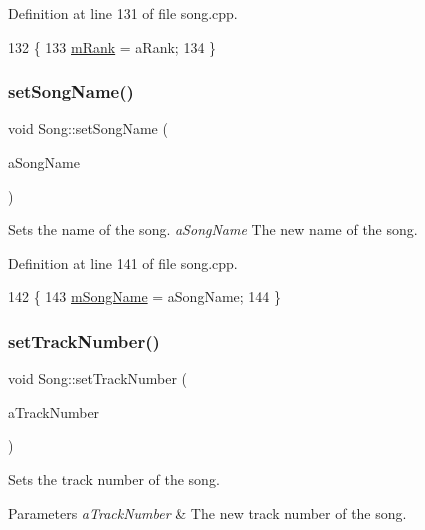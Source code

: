 Definition at line 131 of file song.\+cpp.


\begin{DoxyCode}
132 \{
133     \mbox{\hyperlink{class_song_a18b47d2545fc5e7795cad143092c97e7}{mRank}} = aRank;
134 \}
\end{DoxyCode}
\mbox{\label{class_song_a8ae97c3e5d99c7e8df2e1b7b4f0274ec}} 
\subsubsection{\texorpdfstring{set\+Song\+Name()}{setSongName()}}
{\footnotesize\ttfamily void Song\+::set\+Song\+Name (\begin{DoxyParamCaption}\item[{Q\+String}]{a\+Song\+Name }\end{DoxyParamCaption})}



Sets the name of the song. {\itshape a\+Song\+Name} The new name of the song. 



Definition at line 141 of file song.\+cpp.


\begin{DoxyCode}
142 \{
143     \mbox{\hyperlink{class_song_af7fae22fdde85f62397c5a3618e8e573}{mSongName}} = aSongName;
144 \}
\end{DoxyCode}
\mbox{\label{class_song_ab005f32d793e26e83d67132931d46769}} 
\subsubsection{\texorpdfstring{set\+Track\+Number()}{setTrackNumber()}}
{\footnotesize\ttfamily void Song\+::set\+Track\+Number (\begin{DoxyParamCaption}\item[{int}]{a\+Track\+Number }\end{DoxyParamCaption})}



Sets the track number of the song. 


\begin{DoxyParams}{Parameters}
{\em a\+Track\+Number} & The new track number of the song. \\
\hline
\end{DoxyParams}


